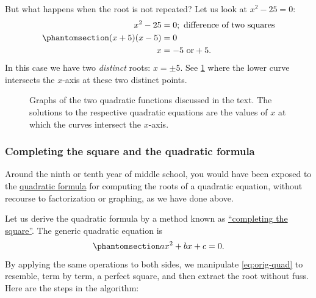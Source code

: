 \documentclass[
  a4paper,
]{article}
\begin{document}
But what happens when the root is not repeated? Let us look at
\(x^2 - 25 = 0\):
\begin{equation}\phantomsection\label{eq:plus-minus-five}{
\begin{aligned}
x^2 - 25 &= 0; \text{ difference of two squares}\\
(x + 5)(x - 5) &= 0\\
x &= -5 \text{ or} +5.\\ 
\end{aligned}
}\end{equation} In this case we have two \emph{distinct} roots:
\(x = \pm5\). See \cref{fig:quadratic-graphs} where the lower curve
intersects the \(x\)-axis at these two distinct points.

\begin{figure}
\centering

\caption{Graphs of the two quadratic functions discussed in the text.
The solutions to the respective quadratic equations are the values of
\(x\) at which the curves intersect the
\(x\)-axis.}\label{fig:quadratic-graphs}
\end{figure}

\subsubsection{Completing the square and the quadratic
formula}\label{completing-the-square-and-the-quadratic-formula}

Around the ninth or tenth year of middle school, you would have been
exposed to the
\href{https://en.wikipedia.org/wiki/Quadratic_formula}{quadratic
formula} for computing the roots of a quadratic equation, without
recourse to factorization or graphing, as we have done above.

Let us derive the quadratic formula by a method known as
\href{https://en.wikipedia.org/wiki/Completing_the_square}{``completing
the square''}. The generic quadratic equation is
\begin{equation}\phantomsection\label{eq:orig-quad}{
ax^2 + bx + c = 0.
}\end{equation} By applying the same operations to both sides, we
manipulate \cref{eq:orig-quad} to resemble, term by term, a perfect
square, and then extract the root without fuss. Here are the steps in
the algorithm:
\end{document}
